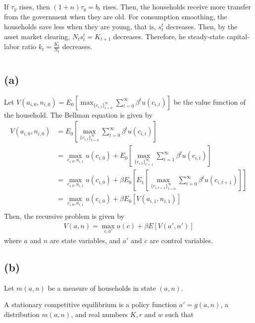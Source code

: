 \documentclass{ltjsarticle}
\begin{document}
If $\tau_y$ rises, then $(1+n)\tau_y = b_t$ rises. Then, the households receive more transfer from the government when they are old. For consumption smoothing, the households save less when they are young, that is, $s_t^t$ decreases. Then, by the asset market clearing, $N_t s_t^t = K_{t+1}$ decreases. Therefore, he steady-state capital-labor ratio $k_t = \frac{K_t}{N_t}$ decreases.

\section{} %

\subsection*{(a)}

Let $V(a_{i,0}, n_{i,0}) = E_0 \left[\max_{\{c_{i,t}\}_{t=0}^{\infty}} \sum_{t=0}^{\infty} \beta^t u(c_{i,t})\right]$ be the value function of the household. The Bellman equation is given by
\begin{align*}
    V(a_{i,0}, n_{i,0}) 
    &= E_0 \left[\max_{\{c_{i,t}\}_{t=0}^{\infty}} \sum_{t=0}^{\infty} \beta^t u(c_{i,t}) \right] \\
    &= \max_{c_{i,0}, a_{i,1}} u(c_{i,0}) + E_0 \left[ \max_{\{c_{i,t}\}_{t=1}^{\infty}} \sum_{t=1}^{\infty} \beta^t u(c_{i,t}) \right] \\
    &= \max_{c_{i,0}, a_{i,1}} u(c_{i,0}) + \beta E_0 \left[E_1 \left[\max_{\{c_{i,t+1}\}_{t=0}^{\infty}} \sum_{t=0}^{\infty} \beta^t u(c_{i,t+1}) \right] \right] \\
    &= \max_{c_{i,0}, a_{i,1}} u(c_{i,0}) + \beta E_0 [V(a_{i,1}, n_{i,1}) ]\\
\end{align*}
Then, the recursive problem is given by
\begin{gather*}
  V(a,n) = \max_{c, a'} u(c) + \beta E[V(a', n')] 
\end{gather*}
where $a$ and $n$ are state variables, and $a'$ and $c$ are control variables.

\subsection*{(b)}
Let $m(a,n)$ be a measure of households in state $(a,n)$.

A stationary competitive equilibrium is a policy function $a' = g(a,n)$, a distribution $m(a,n)$, and real numbers $K, r$ and $w$ such that
\end{document}
